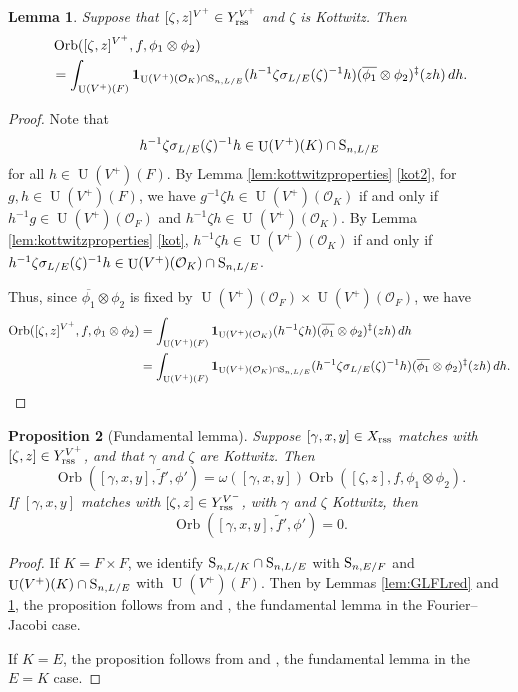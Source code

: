 \documentclass[11pt, reqno]{amsart}
\numberwithin{equation}{subsection}
\theoremstyle{plain}
\newtheorem{proposition}{Proposition}[subsection]
\newtheorem{lem}[proposition]{Lemma}
\theoremstyle{definition}
\renewcommand{\O}{\mathcal O}
\newcommand{\ol}{\overline}
\renewcommand{\S}{\textnormal{S}}
\DeclareMathOperator{\Orb}{Orb}
\DeclareMathOperator{\U}{U}
\newcommand{\rss}{\textnormal{rss}}
\begin{document}
\begin{lem}
\label{lem:UFLred}
    Suppose that $[\zeta, z]^{V^+} \in Y_\rss^{V^+}$
    and $\zeta$ is Kottwitz. 
    Then
    \begin{align*}
        &\Orb([\zeta, z]^{V^+}, f, \phi_1 \otimes \phi_2)
        \\&= \int_{\U(V^+)(F)}
        \mathbf{1}_{\U(V^+)(\O_K) \cap \S_{n, L/E}}(h^{-1}
        \zeta\sigma_{L/E}(\zeta)^{-1} h)
        (\ol{\phi_1} \otimes \phi_2)^{\ddagger}(zh)\, dh.
    \end{align*}
\end{lem}
\begin{proof}
Note that 
\[
    h^{-1}\zeta\sigma_{L/E}(\zeta)^{-1} h \in 
    \U(V^+)(K) \cap \S_{n, L/E}
\]
for all $h \in \U(V^+)(F)$.
By Lemma \ref{lem:kottwitzproperties} \eqref{kot2}, 
for $g, h \in \U(V^+)(F)$, we have
$g^{-1}\zeta h \in \U(V^+)(\O_K)$ if and only if
$h^{-1} g \in \U(V^+)(\O_F)$ and 
$h^{-1}\zeta h \in \U(V^+)(\O_K)$.
By Lemma \ref{lem:kottwitzproperties} \eqref{kot},
$h^{-1}\zeta h \in \U(V^+)(\O_K)$ if and only if
$h^{-1} \zeta \sigma_{L/E}(\zeta)^{-1} h \in
\U(V^+)(\O_K) \cap \S_{n, L/E}$.

Thus, since $\ol{\phi_1} \otimes \phi_2$ is fixed by 
$\U(V^+)(\O_F) \times \U(V^+)(\O_F)$,
we have
\begin{align*}
    \Orb([\zeta, z]^{V^+}, f, \phi_1 \otimes \phi_2) &= 
    \int_{\U(V^+)(F)} \mathbf{1}_{\U(V^+)(\O_K)}
    (h^{-1}\zeta h) 
    (\ol{\phi_1} \otimes \phi_2)^\ddagger(zh)\, dh \\
    &= \int_{\U(V^+)(F)} \mathbf{1}_{\U(V^+)(\O_K) \cap \S_{n, L/E}}
    (h^{-1} \zeta\sigma_{L/E}(\zeta)^{-1} h) 
    (\ol{\phi_1} \otimes \phi_2)^\ddagger(zh)\, dh.
    \qedhere
\end{align*}
\end{proof}

\begin{proposition}[Fundamental lemma]
\label{prop:FL}
    Suppose $[\gamma, x, y] \in X_\rss$
    matches with $[\zeta, z] \in Y_\rss^{V^+}$,
    and that $\gamma$ and $\zeta$ are Kottwitz.
    Then
    \[
        \Orb([\gamma, x, y], \widetilde f', \phi') =
        \omega([\gamma, x, y])
        \Orb([\zeta, z], f, \phi_1 \otimes \phi_2).
    \]
    If $[\gamma, x, y]$ matches with
    $[\zeta, z] \in Y_\rss^{V^-}$, with
    $\gamma$ and $\zeta$ Kottwitz, then
    \[
        \Orb([\gamma, x, y], \widetilde f', \phi') = 0.
    \] 
\end{proposition}   
\begin{proof}
If $K = F \times F$, we identify
$\S_{n,L/K} \cap \S_{n,L/E}$ with $\S_{n, E/F}$
and $\U(V^+)(K) \cap \S_{n, L/E}$ with $\U(V^+)(F)$.
Then by Lemmas \ref{lem:GLFLred} and \ref{lem:UFLred}, 
the proposition
follows from \cite[Proposition~5.14]{Liu2014relative} and
\cite[Theorem~5.15]{Liu2014relative},
the fundamental lemma in the Fourier--Jacobi case.

If $K = E$, the proposition follows from
\cite[Proposition~4.18]{TGGP-Wang} and
\cite[Theorem~4.19]{TGGP-Wang},
the fundamental lemma in the $E = K$ case.
\end{proof}
\end{document}
